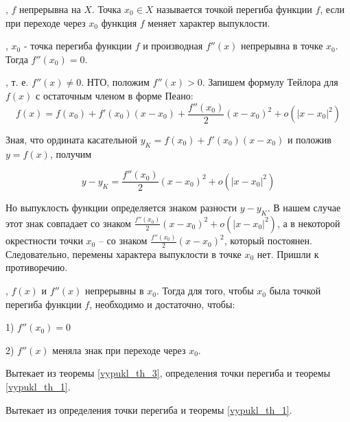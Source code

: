 \opred
\fXR, $f$ непрерывна на $X$. Точка ${x_0 \in X}$ называется точкой перегиба функции $f$, если при переходе через $x_0$ функция $f$ меняет характер выпуклости.

\begin{teorema}\label{vypukl_th_3}
\fXR, $x_0$ - точка перегиба функции $f$ и производная $f''(x)$ непрерывна в точке $x_0$.
Тогда $f''(x_0)=0$.
\end{teorema}

\dokvo

\pp, т. е. $f''(x)\neq 0$.
НТО, положим $f''(x)>0$. Запишем формулу Тейлора для $f(x)$ с остаточным членом в форме Пеано:
$$
f(x)=f(x_0)+f'(x_0)(x-x_0)+\frac{f''(x_0)}{2}(x-x_0)^2+o(|x-x_0|^2)
$$

Зная, что ордината касательной $y_K=f(x_0)+f'(x_0)(x-x_0)$ и положив $y=f(x)$, получим

$$
y-y_K=\frac{f''(x_0)}{2}(x-x_0)^2+o(|x-x_0|^2)
$$

Но выпуклость функции определяется знаком разности $y-y_K$.
В нашем случае этот знак совпадает со знаком $\frac{f''(x_0)}{2}(x-x_0)^2+o(|x-x_0|^2)$, а в некоторой окрестности точки $x_0$ -- со знаком $\frac{f''(x_0)}{2}(x-x_0)^2$, который постоянен.
Следовательно, перемены характера выпуклости в точке $x_0$ нет.
Пришли к противоречию.

\dokno

\begin{teorema}\label{vypukl_th_4}
\fXR, $f(x)$ и $f''(x)$ непрерывны в $x_0$.
Тогда для того, чтобы $x_0$ была точкой перегиба функции $f$, необходимо и достаточно, чтобы:

1) $f''(x_0)=0$

2) $f''(x)$ меняла знак при переходе через $x_0$.
\end{teorema}

\dokvo

\neobh
Вытекает из теоремы \ref{vypukl_th_3}, определения точки перегиба и теоремы \ref{vypukl_th_1}.

\dost
Вытекает из определения точки перегиба и теоремы \ref{vypukl_th_1}.



